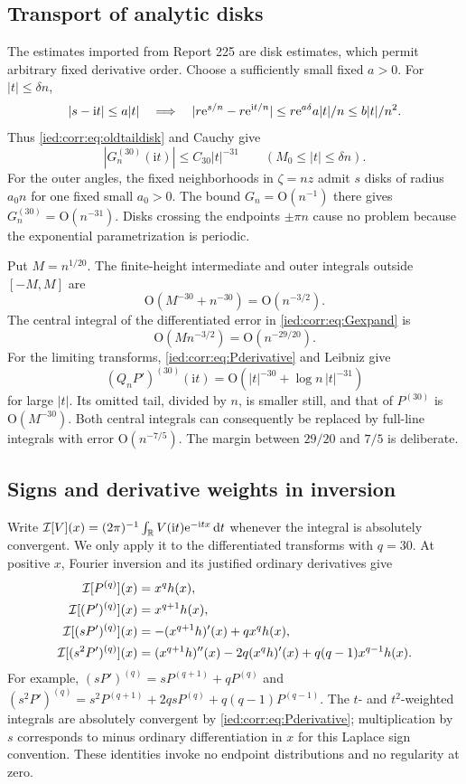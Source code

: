 \documentclass[11pt,letterpaper]{article}
\theoremstyle{remark}\newtheorem{remark}[theorem]{Remark}
\newcommand{\ii}{\mathrm i}\newcommand{\dd}{\,\mathrm d}
\newcommand{\Oh}{\mathrm O}\newcommand{\supp}{\operatorname{supp}}
\begin{document}
\subsection{Transport of analytic disks}
The estimates imported from Report 225 are disk estimates, which permit arbitrary fixed derivative order. Choose a sufficiently small fixed $a>0$. For $|t|\le\delta n$,
\[
 |s-\ii t|\le a|t|\quad\Longrightarrow\quad
 |r\e^{s/n}-r\e^{\ii t/n}|
 \le r\e^{a\delta}a|t|/n\le b|t|/n^2.
\]
Thus \eqref{ied:corr:eq:oldtaildisk} and Cauchy give
\begin{equation}\label{ied:corr:eq:highderivtail}
 |G_n^{(30)}(\ii t)|\le C_{30}|t|^{-31}
       \qquad(M_0\le|t|\le\delta n).
\end{equation}
For the outer angles, the fixed neighborhoods in $\zeta=nz$ admit $s$ disks of radius $a_0n$ for one fixed small $a_0>0$. The bound $G_n=\Oh(n^{-1})$ there gives $G_n^{(30)}=\Oh(n^{-31})$. Disks crossing the endpoints $\pm\pi n$ cause no problem because the exponential parametrization is periodic.

Put $M=n^{1/20}$. The finite-height intermediate and outer integrals outside $[-M,M]$ are
\[
 \Oh(M^{-30}+n^{-30})=\Oh(n^{-3/2}).
\]
The central integral of the differentiated error in \eqref{ied:corr:eq:Gexpand} is
\[
 \Oh(Mn^{-3/2})=\Oh(n^{-29/20}).
\]
For the limiting transforms, \eqref{ied:corr:eq:Pderivative} and Leibniz give
\[
 (Q_nP')^{(30)}(\ii t)
     =\Oh(|t|^{-30}+\log n\,|t|^{-31})
\]
for large $|t|$. Its omitted tail, divided by $n$, is smaller still, and that of $P^{(30)}$ is $\Oh(M^{-30})$. Both central integrals can consequently be replaced by full-line integrals with error $\Oh(n^{-7/5})$. The margin between $29/20$ and $7/5$ is deliberate.

\subsection{Signs and derivative weights in inversion}
Write $\mathcal I[V](x)=(2\pi)^{-1}\int_\R V(\ii t)\e^{-\ii tx}\dd t$ whenever the integral is absolutely convergent. We only apply it to the differentiated transforms with $q=30$. At positive $x$, Fourier inversion and its justified ordinary derivatives give
\begin{align}\label{ied:corr:eq:inversions}
 \mathcal I[P^{(q)}](x)&=x^qh(x),\notag\\
 \mathcal I[(P')^{(q)}](x)&=x^{q+1}h(x),\notag\\
 \mathcal I[(sP')^{(q)}](x)&=-(x^{q+1}h)'(x)+qx^qh(x),\\
 \mathcal I[(s^2P')^{(q)}](x)&=(x^{q+1}h)''(x)
 -2q(x^qh)'(x)+q(q-1)x^{q-1}h(x).\notag
\end{align}
For example,
$(sP')^{(q)}=sP^{(q+1)}+qP^{(q)}$ and
$(s^2P')^{(q)}=s^2P^{(q+1)}+2qsP^{(q)}+q(q-1)P^{(q-1)}$.
The $t$- and $t^2$-weighted integrals are absolutely convergent by \eqref{ied:corr:eq:Pderivative}; multiplication by $s$ corresponds to minus ordinary differentiation in $x$ for this Laplace sign convention. These identities invoke no endpoint distributions and no regularity at zero.
\end{document}
